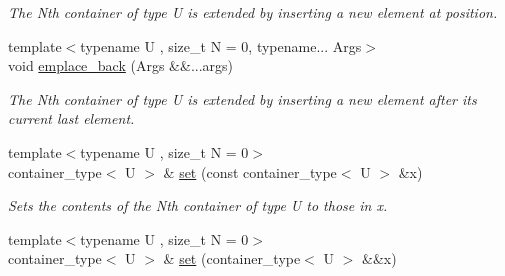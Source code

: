\begin{DoxyCompactItemize}
\begin{DoxyCompactList}\small\item\em The Nth container of type U is extended by inserting a new element at position. \end{DoxyCompactList}\item 
\hypertarget{classheterogeneous_1_1heterovector_3_01_t_00_01_types_8_8_8_4_a8b28864378ea45dd406e6a1daa746c10}{}{\footnotesize template$<$typename U , size\+\_\+t N = 0, typename... Args$>$ }\\void \hyperlink{classheterogeneous_1_1heterovector_3_01_t_00_01_types_8_8_8_4_a8b28864378ea45dd406e6a1daa746c10}{emplace\+\_\+back} (Args \&\&...args)\label{classheterogeneous_1_1heterovector_3_01_t_00_01_types_8_8_8_4_a8b28864378ea45dd406e6a1daa746c10}

\begin{DoxyCompactList}\small\item\em The Nth container of type U is extended by inserting a new element after its current last element. \end{DoxyCompactList}\item 
\hypertarget{classheterogeneous_1_1heterovector_3_01_t_00_01_types_8_8_8_4_a1204de5ebc6b18734b4f83c3a54287b0}{}{\footnotesize template$<$typename U , size\+\_\+t N = 0$>$ }\\container\+\_\+type$<$ U $>$ \& \hyperlink{classheterogeneous_1_1heterovector_3_01_t_00_01_types_8_8_8_4_a1204de5ebc6b18734b4f83c3a54287b0}{set} (const container\+\_\+type$<$ U $>$ \&x)\label{classheterogeneous_1_1heterovector_3_01_t_00_01_types_8_8_8_4_a1204de5ebc6b18734b4f83c3a54287b0}

\begin{DoxyCompactList}\small\item\em Sets the contents of the Nth container of type U to those in x. \end{DoxyCompactList}\item 
\hypertarget{classheterogeneous_1_1heterovector_3_01_t_00_01_types_8_8_8_4_ae27b0924a20cf18628170bf19edea330}{}{\footnotesize template$<$typename U , size\+\_\+t N = 0$>$ }\\container\+\_\+type$<$ U $>$ \& \hyperlink{classheterogeneous_1_1heterovector_3_01_t_00_01_types_8_8_8_4_ae27b0924a20cf18628170bf19edea330}{set} (container\+\_\+type$<$ U $>$ \&\&x)\label{classheterogeneous_1_1heterovector_3_01_t_00_01_types_8_8_8_4_ae27b0924a20cf18628170bf19edea330}


\end{DoxyCompactItemize}
